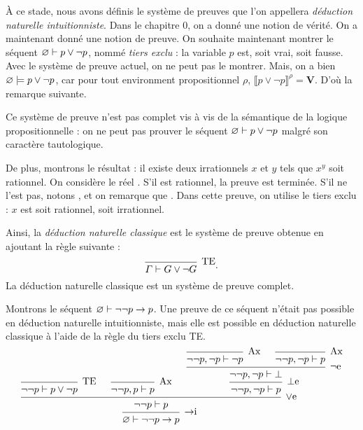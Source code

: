 À ce stade, nous avons définis le système de preuves que l'on appellera \textit{déduction naturelle intuitionniste}.
Dans le chapitre 0, on a donné une notion de vérité. On a maintenant donné une notion de preuve.
On souhaite maintenant montrer le séquent $\varnothing \vdash p \lor \lnot p$, nommé \textit{tiers exclu} : la variable $p$\/ est, soit vrai, soit fausse. Avec le système de preuve actuel, on ne peut pas le montrer.
Mais, on a bien~$\varnothing \models p \lor \lnot p$, car pour tout environment propositionnel $\rho$, $\llbracket p \lor\lnot p \rrbracket^\rho = \mathbf{V}$. D'où la remarque suivante.

\begin{rmk}
	Ce système de preuve n'est pas complet vis à vis de la sémantique de la logique propositionnelle : on ne peut pas prouver le séquent $\varnothing \vdash p \lor \lnot p$\/ malgré son caractère tautologique.
\end{rmk}

\begin{exm}
	De plus, montrons le résultat : il existe deux irrationnels $x$\/ et $y$\/ tels que $x^y$\/ soit rationnel.
	On considère le réel . S'il est rationnel, la preuve est terminée.
	S'il ne l'est pas, notons , et on remarque que .
	Dans cette preuve, on utilise le tiers exclu : $x$\/ est soit rationnel, soit irrationnel.
\end{exm}

Ainsi, la \textit{déduction naturelle classique} est le système de preuve obtenue en ajoutant la règle suivante : \[
	\begin{prooftree}
		\infer 0[TE]{\Gamma \vdash G \lor \lnot G} %
	\end{prooftree}
.\]
La déduction naturelle classique est un système de preuve complet.

\begin{exm}
	Montrons le séquent $\varnothing \vdash \lnot \lnot p \to p$. Une preuve de ce séquent n'était pas possible en déduction naturelle intuitionniste, mais elle est possible en déduction naturelle classique à l'aide de la règle du tiers exclu TE.
	\[
		\begin{prooftree}
			\infer 0[TE]{\lnot \lnot p \vdash p \lor \lnot p} %
			\infer 0[Ax]{\lnot \lnot p,p \vdash p}
			\infer 0[Ax]{\lnot \lnot p,\lnot p \vdash \lnot p}
			\infer 0[Ax]{\lnot \lnot p,\lnot p \vdash p}
			\infer 2[$\lnot$e]{\lnot \lnot p,\lnot p \vdash \bot}
			\infer 1[$\bot$e]{\lnot \lnot p,\lnot p \vdash p}
			\infer 3[$\lor$e]{\lnot \lnot p \vdash p}
			\infer 1[$\to$i]{\O\vdash \lnot \lnot p \to p}
		\end{prooftree}
	\]
\end{exm}

